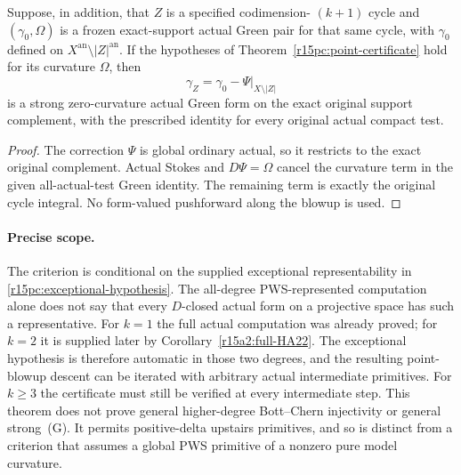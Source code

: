 \begin{corollary}
\label{r15pc:green-pair}
Suppose, in addition, that $Z$ is a specified codimension-
$(k+1)$ cycle and $(\gamma_0,\Omega)$ is a frozen exact-support
actual Green pair for that same cycle, with $\gamma_0$
defined on $X^{\mathrm{an}}\setminus|Z|^{\mathrm{an}}$.
If the hypotheses of Theorem~\ref{r15pc:point-certificate}
hold for its curvature $\Omega$, then
\[
                  \gamma_Z=\gamma_0-\Psi|_{X\setminus|Z|}
\tag{EP15.6}\label{r15pc:Green}
\]
is a strong zero-curvature actual Green form on the exact
original support complement, with the prescribed identity
for every original actual compact test.
\end{corollary}

\begin{proof}
The correction $\Psi$ is global ordinary actual, so it
restricts to the exact original complement.  Actual Stokes
and $D\Psi=\Omega$ cancel the curvature term in the given
all-actual-test Green identity.  The remaining term is
exactly the original cycle integral.  No form-valued
pushforward along the blowup is used.
\end{proof}

\paragraph{Precise scope.}
The criterion is conditional on the supplied exceptional
representability in \eqref{r15pc:exceptional-hypothesis}.
The all-degree PWS-represented computation alone does not say
that every $D$-closed actual form on a projective space has
such a representative.  For $k=1$ the full actual computation
was already proved; for $k=2$ it is supplied later by
Corollary~\ref{r15a2:full-HA22}.  The exceptional hypothesis is
therefore automatic in those two degrees, and the resulting
point-blowup descent can be iterated with arbitrary actual
intermediate primitives.  For $k\geq3$ the certificate must
still be verified at every intermediate step.  This theorem
does not prove general higher-degree Bott--Chern injectivity
or general strong~(G).  It permits positive-delta upstairs primitives,
and so is distinct from a criterion that assumes a global
PWS primitive of a nonzero pure model curvature.
